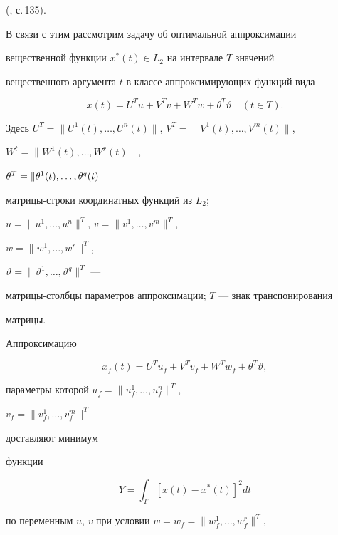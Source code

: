(\cite{2}, с.\,135). 


 


В связи с этим рассмотрим задачу об оптимальной аппроксимации 


вещественной функции $x^*(t)\in L_2$ на интервале $T$ значений 


вещественного аргумента $t$ в классе аппроксимирующих функций вида 


\begin{equation} 


x(t)=U^T u+V^T v+W^T w+\theta^T\vartheta\quad (t\in T). 


\end{equation} 


Здесь $U^T=\|U^1(t),\dotsc,U^n(t)\|$, $V^T=\|V^1(t),\dotsc,V^m(t)\|$, 


$W^t=\|W^1(t),\dotsc,W^r(t)\|$, 


$\theta^T=\linebreak\|\theta^1(t),\dotsc,\theta^q(t)\|$ --- 


матрицы-строки координатных функций из $L_2$; 


$u=\|u^1,\dotsc,u^n\|^T$, $v=\|v^1,\dotsc,v^m\|^T$, 


$w=\|w^1,\dotsc,w^r\|^T$, 


$\vartheta=\|\vartheta^1,\dotsc,\vartheta^q\|^T$ --- 


матрицы-столбцы параметров аппроксимации; $T$ --- знак транспонирования 


матрицы. 


 


Аппроксимацию 


\begin{equation} 


x_f(t)=U^T u_f+V^T v_f+W^T w_f+\theta^T\vartheta, 


\end{equation} 


параметры которой $u_f=\|u^1_f,\dotsc,u^n_f\|^T$, 


$v_f=\|v^1_f,\dotsc,v^m_f\|^T$ 


доставляют минимум 


функции 


\begin{equation} 


Y=\int_T[x(t)-x^*(t)]^2dt 


\end{equation} 


по переменным $u$, $v$ при условии $w=w_f=\|w^1_f,\dotsc,w^r_f\|^T$, 


